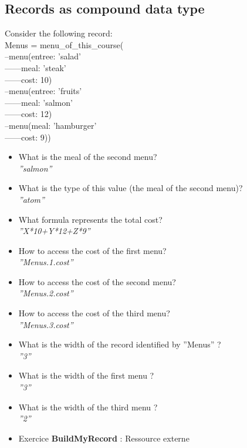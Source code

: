 \documentclass[fr,license=none]{../../../eplsummary}
\begin{document}
		\subsection{Records as compound data type}
			Consider the following record:\\
			Menus = menu\_of\_this\_course(\\
			--menu(entree: 'salad'\\
			------meal: 'steak'\\
			------cost: 10)\\
			--menu(entree: 'fruits'\\
			------meal: 'salmon'\\
			------cost: 12)\\
			--menu(meal: 'hamburger'\\
			------cost: 9))
			\begin{itemize}
				\item What is the meal of the second menu?\\
					\textit{''salmon''}
				\item What is the type of this value (the meal of the second menu)?\\
					\textit{''atom''}
				\item What formula represents the total cost?\\
					\textit{''X*10+Y*12+Z*9''} 
				\item How to access the cost of the first menu?\\
					\textit{''Menus.1.cost''}
				\item How to access the cost of the second menu?\\
					\textit{''Menus.2.cost''}
				\item How to access the cost of the third menu?\\
					\textit{''Menus.3.cost''}
				\item What is the width of the record identified by ''Menus'' ?\\
					\textit{''3''}
				\item What is the width of the first menu ?\\
					\textit{''3''}
				\item What is the width of the third menu ?\\
					\textit{''2''}
				\item Exercice \textbf{BuildMyRecord} : Ressource externe\\
					
			\end{itemize}
\end{document}
